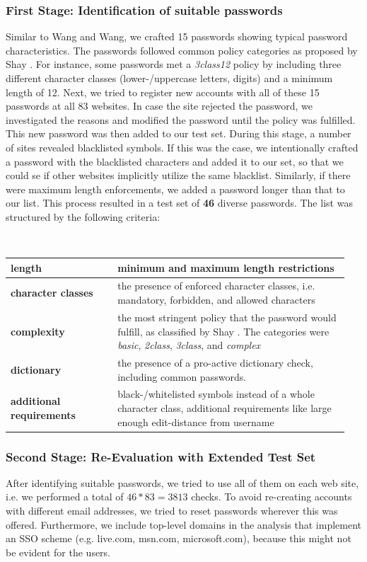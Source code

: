 \subsubsection{First Stage: Identification of suitable passwords} Similar to Wang and Wang, we crafted 15 passwords showing typical password characteristics. The passwords followed common policy categories as proposed by Shay \etal \cite{Shay2016DesigningPasswordPolicies}. For instance, some passwords met a \textit{3class12} policy by including three different character classes (lower-/uppercase letters, digits) and a minimum length of 12. Next, we tried to register new accounts with all of these 15 passwords at all 83 websites. In case the site rejected the password, we investigated the reasons and modified the password until the policy was fulfilled. This new password was then added to our test set. During this stage, a number of sites revealed blacklisted symbols. If this was the case, we intentionally crafted a password with the blacklisted characters and added it to our set, so that we could se if other websites implicitly utilize the same blacklist. Similarly, if there were maximum length enforcements, we added a password longer than that to our list. This process resulted in a test set of \textbf{46} diverse passwords. The list was structured by the following criteria:\par
\noindent~\\
\noindent
\begin{tabular}{@{}p{0.3\linewidth}p{0.65\linewidth}@{}}
	\textbf{length} & minimum and maximum length restrictions\\\hline
	\textbf{character classes} & the presence of enforced character classes, i.e. mandatory, forbidden, and allowed characters\\\hline
	\textbf{complexity} & the most stringent policy that the password would fulfill, as classified by Shay \etal \cite{Shay2016DesigningPasswordPolicies}. The categories were \textit{basic}, \textit{2class}, \textit{3class}, and \textit{complex}\\\hline
	\textbf{dictionary} &  the presence of a pro-active dictionary check, including common passwords.\\\hline
	\textbf{additional requirements} &  black-/whitelisted symbols instead of a whole character class, additional requirements like large enough edit-distance from username
\end{tabular}

\subsubsection{Second Stage: Re-Evaluation with Extended Test Set} After identifying suitable passwords, we tried to use all of them on each web site, i.e. we performed a total of $46*83=3813$ checks. To avoid re-creating accounts with different email addresses, we tried to reset passwords wherever this was offered. 
Furthermore, we include top-level domains in the analysis that implement an \gls{SSO} scheme (e.g. live.com, msn.com, microsoft.com), because this might not be evident for the users. 


